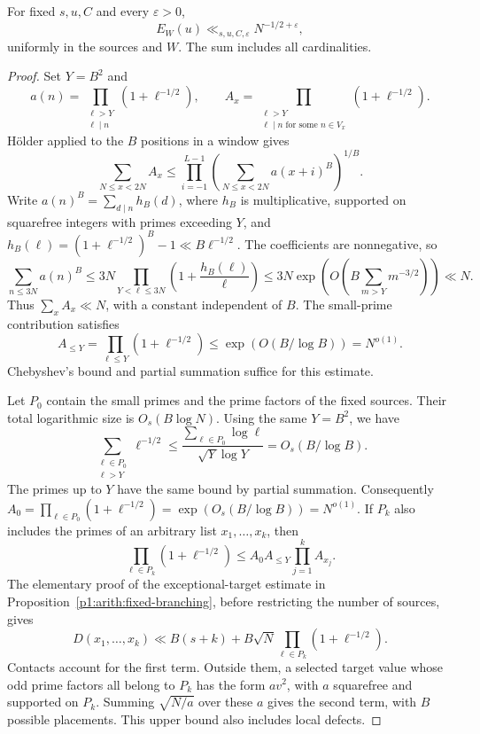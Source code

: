 \begin{lemma}
\label{p13:transfer:independent-deficit}
For fixed $s,u,C$ and every $\varepsilon>0$,
\begin{equation}
 E_W(u)\ll_{s,u,C,\varepsilon}N^{-1/2+\varepsilon},
 \label{p13:transfer:independent-bound}
\end{equation}
uniformly in the sources and $W$. The sum includes all cardinalities.
\end{lemma}

\begin{proof}
Set $Y=B^2$ and
\[
 a(n)=\prod_{\substack{\ell>Y\\\ell\mid n}}(1+\ell^{-1/2}),\qquad
 A_x=\prod_{\substack{\ell>Y\\\ell\mid n\text{ for some }n\in V_x}}
                                    (1+\ell^{-1/2}).
\]
H\"older applied to the $B$ positions in a window gives
\[
 \sum_{N\leq x<2N}A_x
 \leq\prod_{i=-1}^{L-1}
          \left(\sum_{N\leq x<2N}a(x+i)^B\right)^{1/B}.
\]
Write $a(n)^B=\sum_{d\mid n}h_B(d)$, where $h_B$ is multiplicative,
supported on squarefree integers with primes exceeding $Y$, and
$h_B(\ell)=(1+\ell^{-1/2})^B-1\ll B\ell^{-1/2}$.
The coefficients are nonnegative, so
\[
 \sum_{n\leq3N}a(n)^B
 \leq3N\prod_{Y<\ell\leq3N}\left(1+\frac{h_B(\ell)}\ell\right)
 \leq3N\exp\left(O\left(B\sum_{m>Y}m^{-3/2}\right)\right)
 \ll N.
\]
Thus $\sum_xA_x\ll N$, with a constant independent of $B$.
The small-prime contribution satisfies
\[
 A_{\leq Y}=\prod_{\ell\leq Y}(1+\ell^{-1/2})
       \leq\exp(O(B/\log B))=N^{o(1)}.
\]
Chebyshev's bound and partial summation suffice for this estimate.

Let $P_0$ contain the small primes and the prime factors of the fixed
sources. Their total logarithmic size is $O_s(B\log N)$.
Using the same $Y=B^2$, we have
\[
 \sum_{\substack{\ell\in P_0\\\ell>Y}}\ell^{-1/2}
 \leq\frac{\sum_{\ell\in P_0}\log\ell}{\sqrt Y\log Y}
       =O_s(B/\log B).
\]
The primes up to $Y$ have the same bound by partial summation.
Consequently $A_0=\prod_{\ell\in P_0}(1+\ell^{-1/2})
=\exp(O_s(B/\log B))=N^{o(1)}$.
If $P_k$ also includes the primes of an
arbitrary list $x_1,\ldots,x_k$, then
\[
 \prod_{\ell\in P_k}(1+\ell^{-1/2})
       \leq A_0A_{\leq Y}\prod_{j=1}^k A_{x_j}.
\]
The elementary proof of the exceptional-target estimate
in Proposition~\ref{p1:arith:fixed-branching}, before restricting the
number of sources, gives
\begin{equation}
 D(x_1,\ldots,x_k)
 \ll B(s+k)+B\sqrt N\prod_{\ell\in P_k}(1+\ell^{-1/2}).
 \label{p13:transfer:explicit-exception}
\end{equation}
Contacts account for the first term. Outside them, a selected target
value whose odd prime factors all belong to $P_k$ has the form $a v^2$,
with $a$ squarefree and supported on $P_k$. Summing
$\sqrt{N/a}$ over these $a$ gives the second term, with $B$ possible
placements. This upper bound also includes local defects.


\end{proof}

